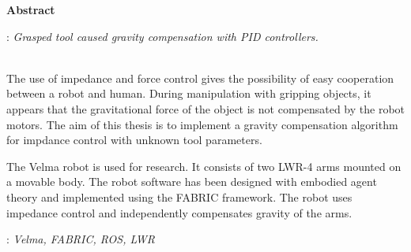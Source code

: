 \vspace*{\baselineskip}
\begin{center}
	{\large\bfseries Abstract}\par\bigskip
\end{center}
: {\itshape Grasped tool caused gravity compensation with PID controllers.}
\\\\
{ 
	The use of impedance and force control gives the possibility of easy cooperation between a robot and human. During manipulation with gripping objects, it appears that the gravitational force of the object is not compensated by the robot motors. The aim of this thesis is to implement a gravity compensation algorithm for impdance control with unknown tool parameters.
	
	The Velma robot is used for research. It consists of two LWR-4 arms mounted on a movable body. The robot software has been designed with embodied agent theory and implemented using the FABRIC framework. The robot uses impedance control and independently compensates gravity of the arms.
}\par
\vspace*{1\baselineskip}
: {\itshape Velma, FABRIC, ROS, LWR}

\clearpage\mbox{}\newpage



\clearpage\mbox{}\newpage




